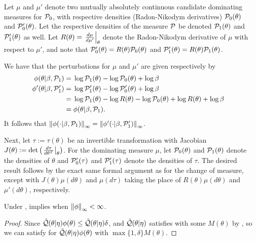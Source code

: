 Let $\mu$ and $\mu'$ denote two mutually absolutely continuous candidate
dominating measures for $\mathcal{P}_{0}$, with respective densities (Radon-Nikodym
derivatives) $\mathcal{P}_{0}(\theta)$ and $\mathcal{P}_{0}'(\theta)$.  Let the respective
densities of the measure $\mathcal{P}$ be denoted $\mathcal{P}_{1}(\theta)$ and $\mathcal{P}_{1}'(\theta)$ as
well.  Let $R(\theta) = \left.\frac{d\mu}{d\mu'}\right\vert_{\theta}$ denote the Radon-Nikodym
derivative of $\mu$ with respect to $\mu'$, and note that $\mathcal{P}_{0}'(\theta) =
R(\theta) \mathcal{P}_{0}(\theta)$ and $\mathcal{P}_{1}'(\theta) = R(\theta) \mathcal{P}_{1}(\theta)$.

We have that the perturbations for $\mu$ and $\mu'$ are given respectively by
%
\begin{align*}
%
\phi(\theta \vert \beta, \palt) ={}&
  \log \palt(\theta) - \log \pbase(\theta) + \log \beta \\
\phi'(\theta \vert \beta, \palt') ={}&
    \log \palt'(\theta) - \log \pbase'(\theta) + \log \beta
\\={}&
\log \palt(\theta) - \log R(\theta)
    - \log \pbase(\theta) + \log R(\theta)+ \log \beta
\\={}&
\phi(\theta \vert \beta, \palt).
%
\end{align*}
%
It follows that $\left\Vert\phi(\cdot \vert \beta, \mathcal{P}_{1})\right\Vert_{\infty} = \left\Vert\phi'(\cdot
\vert \beta, \mathcal{P}_{1}')\right\Vert_{\infty}$.

Next, let $\tau := \tau(\theta)$ be an invertible transformation with Jacobian
$J(\theta) := \mathrm{det}\left(\left.\frac{d\tau}{d\theta^T}\right\vert_{\theta}\right)$. For
the dominating measure $\mu$, let $\mathcal{P}_{0}(\theta)$ and $\mathcal{P}_{1}(\theta)$ denote
the densities of $\theta$ and $\mathcal{P}_{0}'(\tau)$ and $\mathcal{P}_{1}'(\tau)$ denote the
densities of $\tau$.  The desired result follows by the exact same formal
argument as for the change of measure, except with $J(\theta) \mu(d\theta)$
and $\mu(d\tau)$ taking the place of $R(\theta) \mu(d\theta)$ and
$\mu'(d\theta)$, respectively.
%

\vspace{1em}

\begin{lem}
%
Under ,
 implies  when
$\left\Vert\phi\right\Vert_{\infty} < \infty$.

\begin{proof}
%
Since $\tilde{\mathcal{Q}}(\theta \vert \eta) \phi(\theta) \le \tilde{\mathcal{Q}}(\theta \vert \eta)
\delta$, and $\tilde{\mathcal{Q}}(\theta \vert \eta)$ satisfies  with
some $M(\theta)$ by , so we can satisfy
 for $\tilde{\mathcal{Q}}(\theta \vert \eta) \phi(\theta)$ with
$\max\{1, \delta\} M(\theta)$.
%
\end{proof}
%
\end{lem}

